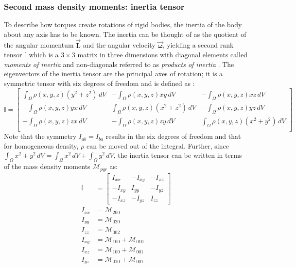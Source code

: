 \documentclass[oneside, a4paper]{book}
\newcommand\vek[1]{\vec{\bm{#1}}}
\newcommand\br[1]{\left(#1\right)}
\begin{document}
    \subsubsection{Second mass density moments: inertia tensor}\label{subsubsec:inertia-tensor-computation}
    To describe how torques create rotations of rigid bodies, the inertia of the body about any axis has to be known. The inertia can be thought of as the quotient of the angular momentum $\vek{L}$ and the angular velocity $\vek{\omega}$, yielding a second rank tensor $\mathds{I}$ which is a $3\times 3$ matrix in three dimensions with diagonal elements called \textit{moments of inertia} and non-diagonals referred to as \textit{products of inertia} \autocite{classical-mechanics}. The eigenvectors of the inertia tensor are the principal axes of rotation; it is a symmetric tensor with six degrees of freedom and is defined as \autocites{fast-accurate-polyhedral-mass-properties}{classical-mechanics}:
    \begin{equation}\label{eq:inertia-tensor-long-definition}
      \mathds{I} = \begin{bmatrix}
        \int_\Omega \rho\br{x,y,z} \br{y^2+z^2} \,dV&
        -\int_\Omega  \rho\br{x,y,z} xy \,dV&
        -\int_\Omega  \rho\br{x,y,z} xz \,dV\\
        -\int_\Omega  \rho\br{x,y,z} yx \,dV&
        \int_\Omega  \rho\br{x,y,z} \br{x^2+z^2} \,dV&
        -\int_\Omega  \rho\br{x,y,z} yz \,dV\\
        -\int_\Omega  \rho\br{x,y,z} zx \,dV&
        -\int_\Omega  \rho\br{x,y,z} zy \,dV&
        \int_\Omega   \rho\br{x,y,z} \br{x^2+y^2} \,dV\\
      \end{bmatrix}
    \end{equation}
    Note that the symmetry $I_{ab} = I_{ba}$ results in the six degrees of freedom and that for homogeneous density, $\rho$ can be moved out of the integral. Further, since $\int_\Omega x^2+y^2\,dV = \int_\Omega x^2\,dV + \int_\Omega y^2\,dV$, the inertia tensor can be written in terms of the mass density moments $\mathcal{M}_{pqr}$ as:
    \begin{align}
      \mathds{I} &= \begin{bmatrix}
        I_{xx}&-I_{xy}&-I_{xz}\\
        -I_{xy}&I_{yy}&-I_{yz}\\
        -I_{xz}&-I_{yz}&I_{zz}
      \end{bmatrix}\\
      I_{xx} &= \mathcal{M}_{200}\\
      I_{yy} &= \mathcal{M}_{020}\\
      I_{zz} &= \mathcal{M}_{002}\\
      I_{xy} &= \mathcal{M}_{100} + \mathcal{M}_{010}\\
      I_{xz} &= \mathcal{M}_{100} + \mathcal{M}_{001}\\
      I_{yz} &= \mathcal{M}_{010} + \mathcal{M}_{001}
    \end{align}
\end{document}
